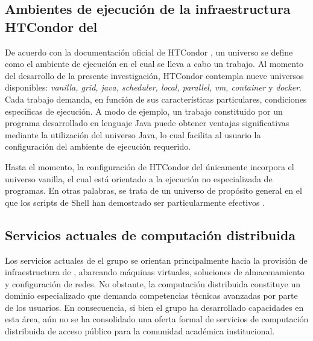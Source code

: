 \subsection{Ambientes de ejecución de la infraestructura HTCondor del \GRID}
\noindent{}
De acuerdo con la documentación oficial de HTCondor \citep{HTCondor-choosing-universe}, un universo se define como el ambiente de ejecución en el cual se lleva a cabo un trabajo. Al momento del desarrollo de la presente investigación, HTCondor contempla nueve universos disponibles: \textit{vanilla, grid, java, scheduler, local, parallel, vm, container} y \textit{docker}. Cada trabajo demanda, en función de sus características particulares, condiciones específicas de ejecución. A modo de ejemplo, un trabajo constituido por un programa desarrollado en lenguaje Java puede obtener ventajas significativas mediante la utilización del universo Java, lo cual facilita al usuario la configuración del ambiente de ejecución requerido.

Hasta el momento, la configuración de HTCondor del \GRID únicamente incorpora el universo vanilla, el cual está orientado a la ejecución no especializada de programas. En otras palabras, se trata de un universo de propósito general en el que los scripts de Shell han demostrado ser particularmente efectivos \citep{HTCondor-choosing-universe}.


\subsection{Servicios actuales de computación distribuida}
\noindent
Los servicios actuales de el grupo \GRID se orientan principalmente hacia la provisión de infraestructura de \TI, abarcando máquinas virtuales, soluciones de almacenamiento y configuración de redes. No obstante, la computación distribuida constituye un dominio especializado que demanda competencias técnicas avanzadas por parte de los usuarios. En consecuencia, si bien el grupo ha desarrollado capacidades en esta área, aún no se ha consolidado una oferta formal de servicios de computación distribuida de acceso público para la comunidad académica institucional.

%
